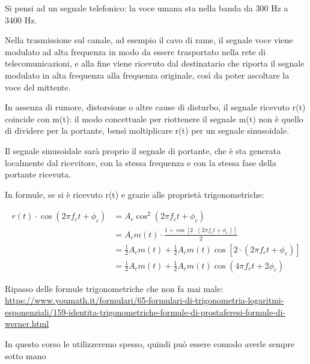 Si pensi ad un segnale telefonico: la voce umana sta nella banda da 300 Hz a 3400 Hz. \newline 

Nella trasmissione sul canale, ad esempio il cavo di rame, il segnale voce viene modulato ad alta frequenza 
in modo da essere trasportato nella rete di telecomunicazioni, e alla fine viene ricevuto dal destinatario che riporta il segnale modulato in alta frequenza alla frequenza originale, 
così da poter ascoltare la voce del mittente. \newline 

In assenza di rumore, distorsione o altre cause di disturbo, 
il segnale ricevuto r(t) coincide con m(t): 
il modo concettuale per riottenere il segnale m(t) non è quello di dividere per la portante, 
bensì moltiplicare r(t) per un segnale sinusoidale. \newline 

Il segnale sinusoidale sarà proprio il segnale di portante, che è sta generata localmente dal ricevitore, 
con la stessa frequenza e con la stessa fase della portante ricevuta. \newline 

In formule, se si è ricevuto r(t) e grazie alle proprietà trigonometriche: 

{
    \Large 
    \begin{equation}
        \begin{split}
        r(t) \cdot \cos(2 \pi f_c t + \phi_c) 
        &=
        A_c \cos^{2}(2 \pi f_c t + \phi_c)
        \\
        &=
        A_c m(t) \cdot \frac{1 + \cos[2\cdot (2 \pi f_c t + \phi_c)]}{2} 
        \\
        &=
        \frac{1}{2} A_c m(t)
        +
        \frac{1}{2} A_c m(t)
        \cos[2\cdot (2 \pi f_c t + \phi_c)]
        \\
        &=
        \frac{1}{2} A_c m(t)
        +
        \frac{1}{2} A_c m(t)
        \cos(4 \pi f_c t + 2 \phi_c)
    \end{split}
    \end{equation}
}

\begin{tcolorbox}
    Ripasso delle formule trigonometriche che non fa mai male: \\
    \url{https://www.youmath.it/formulari/65-formulari-di-trigonometria-logaritmi-esponenziali/159-identita-trigonometriche-formule-di-prostaferesi-formule-di-werner.html} \newline 

    In questo corso le utilizzeremo spesso, quindi può essere comodo averle sempre sotto mano
\end{tcolorbox}

